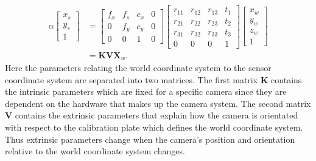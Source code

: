 \documentclass[12pt,oneside,openany,a4paper, %
english, %
masters-t, goldenblock]{usthesis}
\begin{document}
\begin{align}
  \alpha
  \begin{bmatrix}
  x_s \\
  y_s \\
  1
  \end{bmatrix} &=
  \begin{bmatrix}
  f_x & f_s & c_x & 0\\
  0 & f_y & c_y & 0\\
  0 & 0 & 1 & 0
  \end{bmatrix}
  \begin{bmatrix}
  r_{11} & r_{12} & r_{13} & t_1 \\
  r_{21} & r_{22} & r_{23} & t_2 \\
  r_{31} & r_{32} & r_{33} & t_3 \\
  0 & 0 & 0 & 1
  \end{bmatrix}
  \begin{bmatrix}
  x_w \\
  y_w \\
  z_w \\
  1
  \end{bmatrix} \\
  &= \bm{K} \bm{V} \bm{X}_w.
  \label{eq:world 2 sensor}
\end{align}
Here the parameters relating the world coordinate system to the sensor coordinate system are separated into two matrices. The first matrix $\bm{K}$ contains the intrinsic parameters which are fixed for a specific camera since they are dependent on the hardware that makes up the camera system. The second matrix $\bm{V}$ contains the extrinsic parameters that explain how the camera is orientated with respect to the calibration plate which defines the world coordinate system. Thus extrinsic parameters change when the camera's position and orientation relative to the world coordinate system changes.



\end{document}
